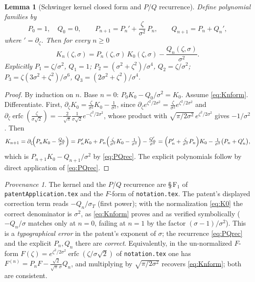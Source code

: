 \documentclass[11pt]{article}
\DeclareMathOperator{\erfc}{erfc}
\theoremstyle{plain}
\newtheorem{lemma}[theorem]{Lemma}
\theoremstyle{definition}
\theoremstyle{remark}
\newtheorem*{provenance}{Provenance}
\begin{document}
\begin{lemma}[Schwinger kernel closed form and $P$/$Q$ recurrence]\label{lem:kernel}
Define polynomial families by
\begin{equation}\label{eq:PQrec}
   P_0=1,\quad Q_0=0,\qquad
   P_{n+1}=P_n'+\frac{\zeta}{\sigma^2}\,P_n,\qquad
   Q_{n+1}=P_n+Q_n',
\end{equation}
where $'=\partial_\zeta$. Then for every $n\ge0$
\begin{equation}\label{eq:Knform}
   K_n(\zeta,\sigma)=P_n(\zeta,\sigma)\,K_0(\zeta,\sigma)
   -\frac{Q_n(\zeta,\sigma)}{\sigma^2}.
\end{equation}
Explicitly $P_1=\zeta/\sigma^2$, $Q_1=1$; $P_2=(\sigma^2+\zeta^2)/\sigma^4$,
$Q_2=\zeta/\sigma^2$; $P_3=\zeta(3\sigma^2+\zeta^2)/\sigma^6$,
$Q_3=(2\sigma^2+\zeta^2)/\sigma^4$.
\end{lemma}
\begin{proof}
By induction on $n$. Base $n=0$: $P_0K_0-Q_0/\sigma^2=K_0$. Assume
\eqref{eq:Knform}. Differentiate. First,
$\partial_\zeta K_0=\frac{\zeta}{\sigma^2}K_0-\frac{1}{\sigma^2}$, since
$\partial_\zeta e^{\zeta^2/2\sigma^2}=\frac{\zeta}{\sigma^2}e^{\zeta^2/2\sigma^2}$
and $\partial_\zeta\erfc(\tfrac{\zeta}{\sigma\sqrt2})
=-\frac{2}{\sqrt\pi}\frac{1}{\sigma\sqrt2}e^{-\zeta^2/2\sigma^2}$, whose product
with $\sqrt{\pi/2\sigma^2}\,e^{\zeta^2/2\sigma^2}$ gives $-1/\sigma^2$. Then
\[
   K_{n+1}=\partial_\zeta\!\Bigl(P_nK_0-\tfrac{Q_n}{\sigma^2}\Bigr)
   =P_n'K_0+P_n\Bigl(\tfrac{\zeta}{\sigma^2}K_0-\tfrac1{\sigma^2}\Bigr)
     -\tfrac{Q_n'}{\sigma^2}
   =\Bigl(P_n'+\tfrac{\zeta}{\sigma^2}P_n\Bigr)K_0
     -\tfrac{1}{\sigma^2}\bigl(P_n+Q_n'\bigr),
\]
which is $P_{n+1}K_0-Q_{n+1}/\sigma^2$ by \eqref{eq:PQrec}. The explicit
polynomials follow by direct application of \eqref{eq:PQrec}.
\end{proof}

\begin{provenance}
The kernel and the $P$/$Q$ recurrence are \S\,F$_1$ of
\texttt{patentApplication.tex} and the $F$-form of \texttt{notation.tex}. The
patent's displayed correction term reads $-Q_n/\sigma_T$ (first power); with the
normalization \eqref{eq:K0} the correct denominator is $\sigma^2$, as
\eqref{eq:Knform} proves and as verified symbolically ($-Q_n/\sigma$ matches only
at $n=0$, failing at $n=1$ by the factor $(\sigma-1)/\sigma^2$). This is a
\emph{typographical error} in the patent's exponent of $\sigma$; the recurrence
\eqref{eq:PQrec} and the explicit $P_n,Q_n$ there are \emph{correct}. Equivalently,
in the un-normalized $F$-form $F(\zeta)=e^{\zeta^2/2\sigma^2}
\erfc(\zeta/\sigma\sqrt2)$ of \texttt{notation.tex} one has
$F^{(n)}=P_nF-\tfrac{\sqrt2}{\sqrt\pi\,\sigma}Q_n$, and multiplying by
$\sqrt{\pi/2\sigma^2}$ recovers \eqref{eq:Knform}; both are consistent.
\end{provenance}
\end{document}
